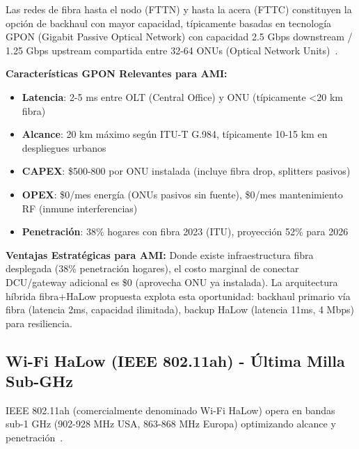 Las redes de fibra hasta el nodo (FTTN) y hasta la acera (FTTC) constituyen la opción de backhaul con mayor capacidad, típicamente basadas en tecnología GPON (Gigabit Passive Optical Network) con capacidad 2.5 Gbps downstream / 1.25 Gbps upstream compartida entre 32-64 ONUs (Optical Network Units)~\cite{ITU-TG.984,broadbandcommissionStateofBroadband2023}.

\textbf{Características GPON Relevantes para AMI:}
\begin{itemize}
\item \textbf{Latencia}: 2-5 ms entre OLT (Central Office) y ONU (típicamente <20 km fibra)
\item \textbf{Alcance}: 20 km máximo según ITU-T G.984, típicamente 10-15 km en despliegues urbanos
\item \textbf{CAPEX}: \$500-800 por ONU instalada (incluye fibra drop, splitters pasivos)
\item \textbf{OPEX}: \$0/mes energía (ONUs pasivos sin fuente), \$0/mes mantenimiento RF (inmune interferencias)
\item \textbf{Penetración}: 38\% hogares con fibra 2023 (ITU), proyección 52\% para 2026~\cite{broadbandcommissionStateofBroadband2023}
\end{itemize}

\textbf{Ventajas Estratégicas para AMI:} Donde existe infraestructura fibra desplegada (38\% penetración hogares), el costo marginal de conectar DCU/gateway adicional es \$0 (aprovecha ONU ya instalada). La arquitectura híbrida fibra+HaLow propuesta explota esta oportunidad: backhaul primario vía fibra (latencia 2ms, capacidad ilimitada), backup HaLow (latencia 11ms, 4 Mbps) para resiliencia.

\subsection{Wi-Fi HaLow (IEEE 802.11ah) - Última Milla Sub-GHz}

IEEE 802.11ah (comercialmente denominado Wi-Fi HaLow) opera en bandas sub-1 GHz (902-928 MHz USA, 863-868 MHz Europa) optimizando alcance y penetración~\cite{IEEE802.11ah-2016,adameTimeVariantChannelModeling2019,liEstimatingPropagationCharacteristics2024}.

